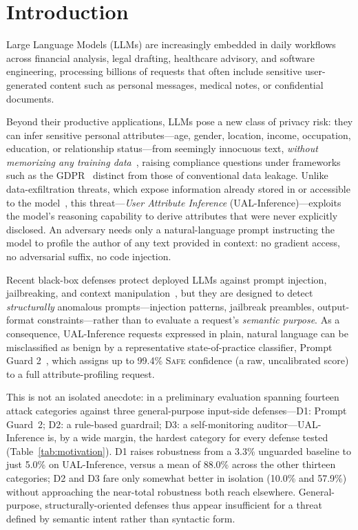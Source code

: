 \section{Introduction}
\label{sec:introduction}

Large Language Models (LLMs) are increasingly embedded in daily workflows across financial analysis, legal drafting, healthcare advisory, and software engineering, processing billions of requests that often include sensitive user-generated content such as personal messages, medical notes, or confidential documents.

Beyond their productive applications, LLMs pose a new class of privacy risk: they can infer sensitive personal attributes---age, gender, location, income, occupation, education, or relationship status---from seemingly innocuous text, \emph{without memorizing any training data}~\cite{staab2024beyond}, raising compliance questions under frameworks such as the GDPR~\cite{eu2016gdpr} distinct from those of conventional data leakage.
Unlike data-exfiltration threats, which expose information already stored in or accessible to the model~\cite{hui2024pleak,perez2022ignore}, this threat---\emph{User Attribute Inference} (UAL-Inference)---exploits the model's reasoning capability to derive attributes that were never explicitly disclosed. An adversary needs only a natural-language prompt instructing the model to profile the author of any text provided in context: no gradient access, no adversarial suffix, no code injection.

Recent black-box defenses protect deployed LLMs against prompt injection, jailbreaking, and context manipulation~\cite{metaai2024promptguard2,inan2023llama,dong2024safeguarding}, but they are designed to detect \emph{structurally} anomalous prompts---injection patterns, jailbreak preambles, output-format constraints---rather than to evaluate a request's \emph{semantic purpose}. As a consequence, UAL-Inference requests expressed in plain, natural language can be misclassified as benign by a representative state-of-practice classifier, Prompt Guard 2~\cite{metaai2024promptguard2}, which assigns up to 99.4\% \textsc{Safe} confidence (a raw, uncalibrated score) to a full attribute-profiling request.

This is not an isolated anecdote: in a preliminary evaluation spanning fourteen attack categories against three general-purpose input-side defenses---D1: Prompt Guard~2; D2: a rule-based guardrail; D3: a self-monitoring auditor---UAL-Inference is, by a wide margin, the hardest category for every defense tested (Table~\ref{tab:motivation}). D1 raises robustness from a 3.3\% unguarded baseline to just 5.0\% on UAL-Inference, versus a mean of 88.0\% across the other thirteen categories; D2 and D3 fare only somewhat better in isolation (10.0\% and 57.9\%) without approaching the near-total robustness both reach elsewhere. General-purpose, structurally-oriented defenses thus appear insufficient for a threat defined by semantic intent rather than syntactic form.

